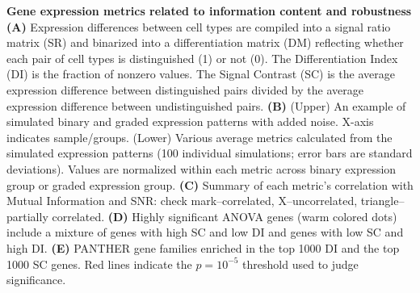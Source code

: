 \textbf{Gene expression metrics related to information content and robustness}
\textbf{(A)} Expression differences between cell types are compiled into a signal ratio matrix (SR) and binarized into a differentiation matrix (DM) reflecting whether each pair of cell types is distinguished (1) or not (0). The Differentiation Index (DI) is the fraction of nonzero values. The Signal Contrast (SC) is the average expression difference between distinguished pairs divided by the average expression difference between undistinguished pairs. 
\textbf{(B)} (Upper) An example of simulated binary and graded expression patterns with added noise. X-axis indicates sample/groups. (Lower) Various average metrics calculated from the simulated expression patterns (100 individual simulations; error bars are standard deviations). Values are normalized within each metric across binary expression group or graded expression group. 
\textbf{(C)} Summary of each metric's correlation with Mutual Information and SNR: check mark--correlated, X--uncorrelated, triangle--partially correlated.
\textbf{(D)} Highly significant ANOVA genes (warm colored dots) include a mixture of genes with high SC and low DI and genes with low SC and high DI. 
\textbf{(E)} PANTHER \citep{Thomas_2003} gene families enriched in the top 1000 DI and the top 1000 SC genes. Red lines indicate the $p=10^{-5}$ threshold used to judge significance.
